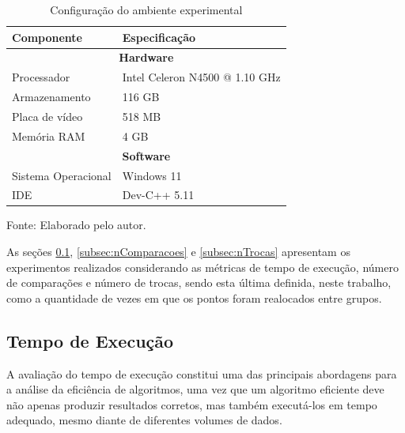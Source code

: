 \documentclass[10pt,a4paper,twocolumn]{article}
\begin{document}
\begin{table}[H]
\centering
\caption{Configuração do ambiente experimental}
\label{tab:hardware_software}

\begin{tabular}{|l|l|}
\hline
\textbf{Componente} & \textbf{Especificação} \\ \hline

\multicolumn{2}{|c|}{\textbf{Hardware}} \\ \hline

Processador &
Intel Celeron N4500 @ 1.10 GHz \\ \hline

Armazenamento &
116 GB \\ \hline

Placa de vídeo &
518 MB \\ \hline

Memória RAM &
4 GB \\ \hline

\multicolumn{2}{|c|}{\textbf{Software}} \\ \hline

Sistema Operacional &
Windows 11 \\ \hline

IDE &
Dev-C++ 5.11 \\ \hline

\end{tabular}

\begin{flushleft}
\footnotesize Fonte: Elaborado pelo autor.
\end{flushleft}

\end{table} 


As seções \ref{subsec:tempoexecucao}, \ref{subsec:nComparacoes} e \ref{subsec:nTrocas} apresentam os experimentos realizados considerando as métricas de tempo de execução, número de comparações e número de trocas, sendo esta última definida, neste trabalho, como a quantidade de vezes em que os pontos foram realocados entre grupos. 


\subsection{Tempo de Execução}
\label{subsec:tempoexecucao}

A avaliação do tempo de execução constitui uma das principais abordagens para a análise da eficiência de algoritmos, uma vez que um algoritmo eficiente deve não apenas produzir resultados corretos, mas também executá-los em tempo adequado, mesmo diante de diferentes volumes de dados\cite{CORMEN2013}.
\end{document}
